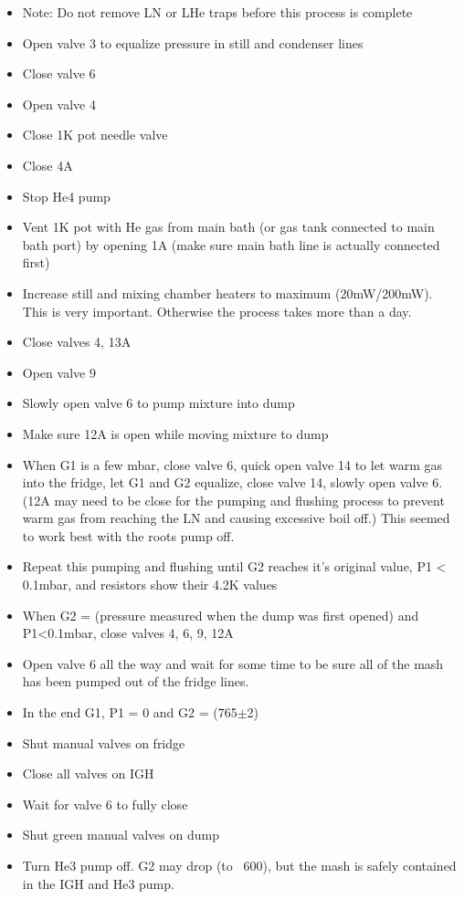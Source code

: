 \begin{itemize}
\item Note: Do not remove LN or LHe traps before this process is complete
\item Open valve 3 to equalize pressure in still and condenser lines
\item Close valve 6
\item Open valve 4
\item Close 1K pot needle valve
\item Close 4A
\item Stop He4 pump
\item Vent 1K pot with He gas from main bath (or gas tank connected to main bath port) by opening 1A (make sure main bath line is actually connected first)
\item Increase still and mixing chamber heaters to maximum (20mW/200mW). This is very important. Otherwise the process takes more than a day.
\item Close valves 4, 13A
\item Open valve 9
\item Slowly open valve 6 to pump mixture into dump
\item Make sure 12A is open while moving mixture to dump
\item When G1 is a few mbar, close valve 6, quick open valve 14 to let warm gas into the fridge, let G1 and G2 equalize, close valve 14, slowly open valve 6. (12A may need to be close for the pumping and flushing process to prevent warm gas from reaching the LN and causing excessive boil off.) This seemed to work best with the roots pump off.
\item Repeat this pumping and flushing until G2 reaches it’s original value, P1 < 0.1mbar, and resistors show their 4.2K values
\item When G2 = (pressure measured when the dump was first opened) and P1<0.1mbar, close valves 4, 6, 9, 12A
\item Open valve 6 all the way and wait for some time to be sure all of the mash has been pumped out of the fridge lines.
\item In the end G1, P1 = 0 and G2 = (765$\pm$2)
\item Shut manual valves on fridge
\item Close all valves on IGH
\item Wait for valve 6 to fully close
\item Shut green manual valves on dump
\item Turn He3 pump off. G2 may drop (to ~600), but the mash is safely contained in the IGH and He3 pump.
\end{itemize}

